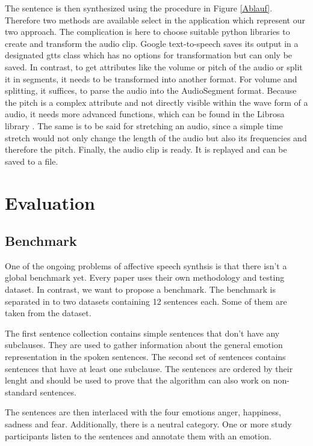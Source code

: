 \documentclass[11pt]{article}
\begin{document}
The sentence is then synthesized using the procedure in Figure \ref{Ablauf}. Therefore two methods are available select in the application which represent our two approach. The complication is here to choose suitable python libraries to create and transform the audio clip. Google text-to-speech \cite{gtts} saves its output in a designated gtts class which has no options for transformation but can only be saved. In contrast, to get attributes like the volume or pitch of the audio or split it in segments, it needs to be transformed into another format. For volume and splitting, it suffices, to parse the audio into the AudioSegment format. Because the pitch is a complex attribute and not directly visible within the wave form of a audio, it needs more advanced functions, which can be found in the Librosa library \cite{McFee2015librosaAA}. The same is to be said for stretching an audio, since a simple time stretch would not only change the length of the audio but also its frequencies and therefore the pitch.
Finally, the audio clip is ready. It is replayed and can be saved to a file.

\section{Evaluation}
\label{evaluation}

\subsection{Benchmark}
One of the ongoing problems of affective speech synthsis is that there isn't a global benchmark yet\cite{triantafyllopoulos_overview_2023}. Every paper uses their own methodology and testing dataset. In contrast, we want to propose a benchmark. The benchmark is separated in to two datasets containing 12 sentences each. Some of them are taken from the \cite{saravia-etal-2018-carer} dataset.

The first sentence collection contains simple sentences that don't have any subclauses. They are used to gather information about the general emotion representation in the spoken sentences. The second set of sentences contains sentences that have at least one subclause. The sentences are ordered by their lenght and should be used to prove that the algorithm can also work on non-standard sentences.

The sentences are then interlaced with the four emotions anger, happiness, sadness and fear. Additionally, there is a neutral category. One or more study participants listen to the sentences and annotate them with an emotion.
\end{document}
